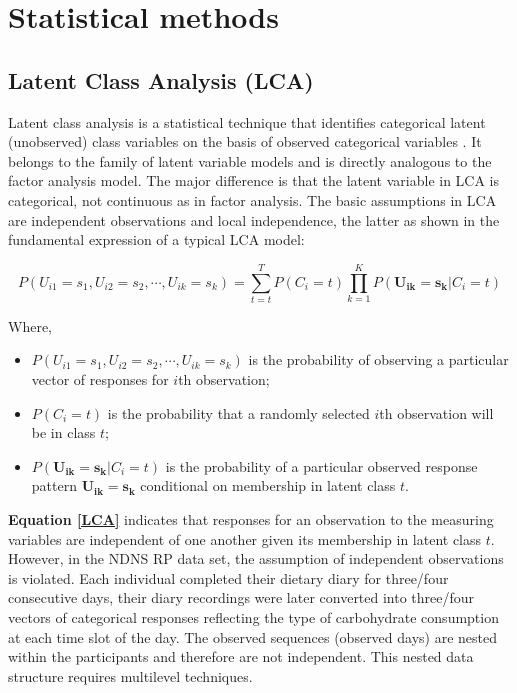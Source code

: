 \section[Statistical methods]{Statistical methods}

\subsection{Latent Class Analysis (LCA)}\vspace{-0.3cm}

Latent class analysis is a statistical technique that identifies categorical latent (unobserved) class variables on the basis of observed categorical variables \parencite{collins2010latent}. It belongs to the family of latent variable models and is directly analogous to the factor analysis model. The major difference is that the latent variable in LCA is categorical, not continuous as in factor analysis. The basic assumptions in LCA are independent observations and local independence, the latter as shown in the fundamental expression of a typical LCA model: \vspace{-0.8cm}

\begin{equation}
P(U_{i1} = s_1, U_{i2} = s_2, \cdots, U_{ik} = s_k) = \sum_{t=t}^{T}P(C_i = t)\prod_{k = 1}^{K}P(\mathbf{U_{ik}} = \mathbf{s_k} | C_i = t)
\label{LCA}
\end{equation}\vspace{-0.7cm}

Where, 

\begin{itemize}
	\item $P(U_{i1} = s_1, U_{i2} = s_2, \cdots, U_{ik} = s_k)$ is the probability of observing a particular vector of responses for $i$th observation;
	\item $P(C_i = t)$ is the probability that a randomly selected $i$th observation will be in class $t$;
	\item $P(\mathbf{U_{ik}} = \mathbf{s_k} | C_i = t)$ is the probability of a particular observed response pattern $\mathbf{U_{ik}} = \mathbf{s_k}$ conditional on membership in latent class $t$.
\end{itemize}


\textbf{Equation \ref{LCA}} indicates that responses for an observation to the measuring variables are independent of one another given its membership in latent class $t$. However, in the NDNS RP data set, the assumption of independent observations is violated. Each individual completed their dietary diary for three/four consecutive days, their diary recordings were later converted into three/four vectors of categorical responses reflecting the type of carbohydrate consumption at each time slot of the day. The observed sequences (observed days) are nested within the participants and therefore are not independent. This nested data structure requires multilevel techniques. 
\vspace{-0.3cm}

